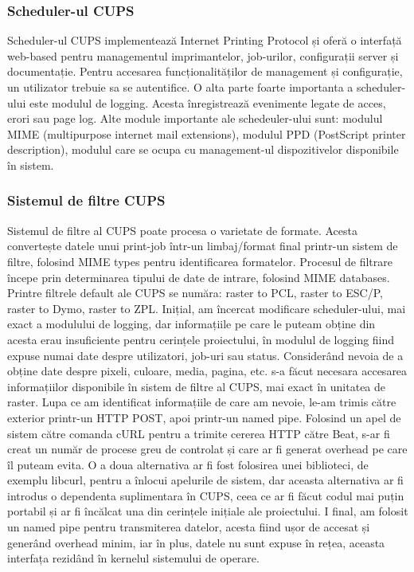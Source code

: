 \documentclass[12pt]{report}
\begin{document}
			\subsubsection{Scheduler-ul CUPS}
Scheduler-ul CUPS implementează Internet Printing Protocol și oferă o interfață web-based pentru managementul imprimantelor, job-urilor, configurații server și documentație. Pentru accesarea funcționalităților de management și configurație, un utilizator trebuie sa se autentifice.
O alta parte foarte importanta a scheduler-ului este modulul de logging. Acesta înregistrează evenimente legate de acces, erori sau page log.
Alte module importante ale schedeuler-ului sunt: modulul MIME (multipurpose internet mail extensions), modulul PPD (PostScript printer description), modulul care se ocupa cu management-ul dispozitivelor disponibile în sistem.


			\subsubsection{Sistemul de filtre CUPS}
Sistemul de filtre al CUPS poate procesa o varietate de formate. Acesta convertește datele unui print-job într-un limbaj/format final printr-un sistem de filtre, folosind MIME types pentru identificarea formatelor.
Procesul de filtrare începe prin determinarea tipului de date de intrare, folosind MIME databases. Printre filtrele default ale CUPS se număra: raster to PCL, raster to ESC/P, raster to Dymo, raster to ZPL.
Inițial, am încercat modificare scheduler-ului, mai exact a modulului de logging, dar informațiile pe care le puteam obține din acesta erau insuficiente pentru cerințele proiectului, în modulul de logging fiind expuse numai date despre utilizatori, job-uri sau status. Considerând nevoia de a obține date despre pixeli, culoare, media, pagina, etc. s-a făcut necesara accesarea informațiilor disponibile în sistem de filtre al CUPS, mai exact în unitatea de raster. Lupa ce am identificat informațiile de care am nevoie, le-am trimis către exterior printr-un HTTP POST, apoi printr-un named pipe. Folosind un apel de sistem către comanda cURL pentru a trimite cererea HTTP către Beat, s-ar fi creat un număr de procese greu de controlat și care ar fi generat overhead pe care îl puteam evita. O a doua alternativa ar fi fost folosirea unei biblioteci, de exemplu libcurl, pentru a înlocui apelurile de sistem, dar aceasta alternativa ar fi introdus o dependenta suplimentara în CUPS, ceea ce ar fi făcut codul mai puțin portabil și ar fi încălcat una din cerințele inițiale ale proiectului. I final, am folosit un named pipe pentru transmiterea datelor, acesta fiind ușor de accesat și generând overhead minim, iar în plus, datele nu sunt expuse în rețea, aceasta interfața rezidând în kernelul sistemului de operare.
\end{document}
